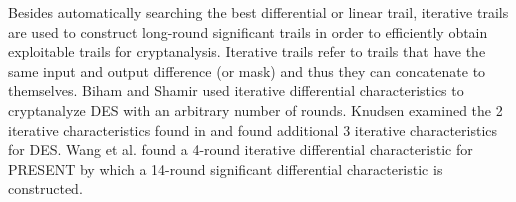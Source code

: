 Besides automatically searching the best differential or linear trail, iterative trails are used to construct long-round significant trails in order to efficiently obtain exploitable trails for cryptanalysis. Iterative trails refer to trails that have the same input and output difference (or mask) and thus they can concatenate to themselves. Biham and Shamir \cite{BS91,BS92} used iterative differential characteristics to cryptanalyze DES with an arbitrary number of rounds. Knudsen \cite{K92} examined the 2 iterative characteristics found in \cite{BS91,BS92} and found additional 3 iterative characteristics for DES. Wang et al. \cite{W08} found a 4-round iterative differential characteristic for PRESENT by which a 14-round significant differential characteristic is constructed. 

